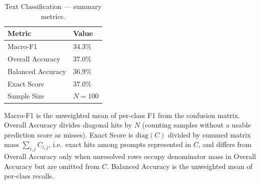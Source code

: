 \begin{table}[htbp]
  \centering
  \caption{Text Classification --- summary metrics.}
  \label{tab:text_classification_metrics}
  \begin{tabular}{ll}
    \toprule
    \textbf{Metric} & \textbf{Value} \\
    \midrule
    Macro-F1          & 34.3\% \\
    Overall Accuracy  & 37.0\% \\
    Balanced Accuracy & 36.9\% \\
    Exact Score       & 37.0\% \\
    Sample Size       & $N = 100$ \\
    \bottomrule
  \end{tabular}
  {\footnotesize Macro-F1 is the unweighted mean of per-class F1 from the confusion matrix. Overall Accuracy divides diagonal hits by $N$ (counting samples without a usable prediction score as misses). Exact Score is $\mathrm{diag}(C)$ divided by summed matrix mass $\sum_{i,j}C_{i,j}$, i.e.\ exact hits among prompts represented in $C$, and differs from Overall Accuracy only when unresolved rows occupy denominator mass in Overall Accuracy but are omitted from $C$. Balanced Accuracy is the unweighted mean of per-class recalls.}
\end{table}
